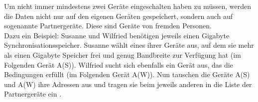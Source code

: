 Um nicht immer mindestens zwei Geräte eingeschalten haben zu müssen, werden die Daten nicht nur auf den eigenen Geräten gespeichert, sondern auch auf sogenannte Partnergeräte. Diese sind Geräte von fremden Personen. \\
Dazu ein Beispiel: Susanne und Wilfried benötigen jeweils einen Gigabyte Synchronisationsspeicher. Susanne wählt eines ihrer Geräte aus, auf dem sie mehr als einen Gigabyte Speicher frei und genug Bandbreite zur Verfügung hat (im Folgenden Gerät A(S)). Wilfried sucht sich ebenfalls ein Gerät aus, das die Bedingungen erfüllt (im Folgenden Gerät A(W)). Nun tauschen die Geräte A(S) und A(W) ihre Adressen aus und tragen sie beim jeweils anderen in die Liste der Partnergeräte ein .